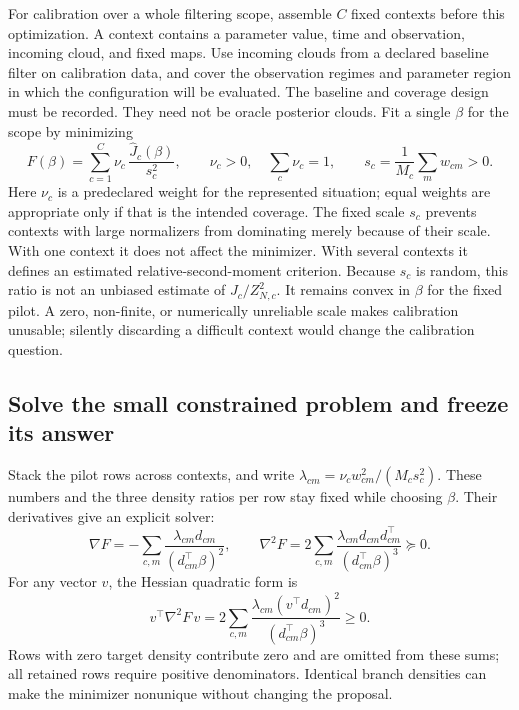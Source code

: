 For calibration over a whole filtering scope, assemble \(C\) fixed contexts
before this optimization. A context contains a parameter value, time and
observation, incoming cloud, and fixed maps. Use incoming clouds from a
declared baseline filter on calibration data, and cover the observation
regimes and parameter region in which the configuration will be evaluated.
The baseline and coverage design must be recorded. They need not be oracle
posterior clouds. Fit a single \(\beta\) for the scope by minimizing
\begin{equation}
\label{eq:bf-covariance-proposal-beta-scope-objective}
 F(\beta)=\sum_{c=1}^C\nu_c\,
       \frac{\widehat J_c(\beta)}{s_c^2},\qquad
 \nu_c>0,\quad\sum_c\nu_c=1,\qquad
 s_c=\frac1{M_c}\sum_m w_{cm}>0.
\end{equation}
Here \(\nu_c\) is a predeclared weight for the represented situation;
equal weights are appropriate only if that is the intended coverage.
The fixed scale \(s_c\) prevents contexts with large normalizers from
dominating merely because of their scale. With one context it does not
affect the minimizer. With several contexts it defines an estimated
relative-second-moment criterion. Because \(s_c\) is random, this ratio is
not an unbiased estimate of \(J_c/Z_{N,c}^2\). It remains convex in \(\beta\)
for the fixed pilot. A zero, non-finite, or numerically unreliable scale
makes calibration unusable; silently discarding a difficult context would
change the calibration question.

\subsection{Solve the small constrained problem and freeze its answer}

Stack the pilot rows across contexts, and write
\(\lambda_{cm}=\nu_cw_{cm}^2/(M_cs_c^2)\). These numbers and the three
density ratios per row stay fixed while choosing \(\beta\). Their derivatives
give an explicit solver:
\begin{equation}
\label{eq:bf-covariance-proposal-beta-derivatives}
 \nabla F=-\sum_{c,m}\frac{\lambda_{cm}d_{cm}}
                                {(d_{cm}^\top\beta)^2},\qquad
 \nabla^2F=2\sum_{c,m}\frac{\lambda_{cm}d_{cm}d_{cm}^\top}
                                {(d_{cm}^\top\beta)^3}\succeq0.
\end{equation}
For any vector \(v\), the Hessian quadratic form is
\[
 v^\top\nabla^2F\,v
 =2\sum_{c,m}\frac{\lambda_{cm}(v^\top d_{cm})^2}
                         {(d_{cm}^\top\beta)^3}\geq0.
\]
Rows with zero target density contribute zero and are omitted from these
sums; all retained rows require positive denominators. Identical branch
densities can make the minimizer nonunique without changing the proposal.

